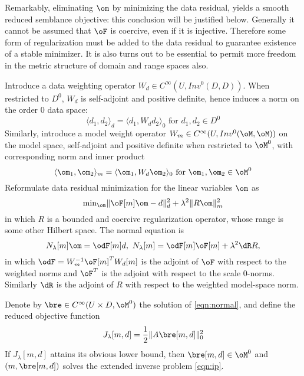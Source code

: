 Remarkably, eliminating $\om$ by minimizing the data residual,  yields a smooth reduced semblance
objective: this conclusion will be justified below.
Generally it cannot
be assumed that $\oF$ is coercive, even if it is
injective. Therefore some form of regularization must be added to the
data residual to guarantee existence of a stable minimizer. It is also
turns out to be essential to
permit more freedom in the metric structure of
domain and range spaces also.

Introduce a data weighting operator $W_d\in C^{\infty}(U,Inv^0(D,D))$.
When restricted to $D^0$, $W_d$ is self-adjoint and positive definite,
hence induces a norm on the order $0$ data space:
\begin{equation}
\label{eqn:wdata}
\langle d_1,d_2 \rangle_d = \langle d_1, W_d d_2\rangle_0 \mbox{ for }
d_1,d_2 \in D^0 
\end{equation}
Similarly, introduce a model weight operator
$W_m\in C^{\infty}(U, Inv^0(\oM,\oM))$ on the model space, self-adjoint and positive definite when restricted to
$\oM^0$, with corresponding norm and inner product
\begin{equation}
\label{eqn:wmodel}
\langle \om_1,\om_2 \rangle_m = \langle \om_1, W_d \om_2\rangle_0 \mbox{ for }
\om_1,\om_2 \in \oM^0 
\end{equation}
Reformulate data residual minimization for the linear 
variables $\om$ as
\begin{equation}
\label{eqn:wredn}
\mbox{min}_{\om}\|\oF[m]\om-d\|^2_d + \lambda^2\|R\om\|_m^2 
\end{equation}
in which $R$ is a bounded and coercive regularization operator, whose
range is some other Hilbert space. The normal equation is
\begin{equation}
\label{eqn:normal}
N_{\lambda}[m]\om = \odF[m]d,\,\,N_{\lambda}[m]
=\odF[m]\oF[m]+\lambda^2 \dR R,
\end{equation}
in which $\odF=W_m^{-1}\oF[m]^TW_d[m]$ is the adjoint of $\oF$ with
respect to the weighted norms and $\oF^T$ is the adjoint with respect
to the scale 0-norms. Similarly $\dR$ is the adjoint of $R$ with respect to
the weighted model-space norm.

Denote by $\bre \in C^{\infty}(U \times D,\oM^0)$ the solution of
\ref{eqn:normal}, and define the reduced objective function 
\begin{equation}
\label{eqn:aredn}
J_{\lambda}[m,d]= \frac{1}{2}\|A\bre[m,d]\|_0^2
\end{equation}
If $J_{\lambda}[m,d]$ attains its obvious lower bound, then $\bre[m,d] \in \oM^0$ and
$(m,\bre[m,d])$ solves the extended inverse problem \ref{eqn:ip}. 

